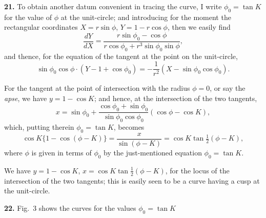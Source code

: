 \documentclass[12pt,a4paper]{article}
\theoremstyle{definition}
\begin{document}
\noindent\textbf{21.} To obtain another datum convenient in tracing the curve, I write $\phi_0 = \tan K$ for the value of $\phi$ at the unit-circle; and introducing for the moment the rectangular coordinates $X = r\sin\phi$, $Y = 1 - r\cos\phi$, then we easily find
\[
\frac{dY}{dX} = \frac{r\sin\phi_0 - \cos\phi}{r\cos\phi_0 + r^3\sin\phi_0\sin\phi},
\]
and thence, for the equation of the tangent at the point on the unit-circle,
\[
\sin\phi_0\cos\phi \cdot (Y - 1 + \cos\phi_0) = -\frac{1}{r^2}(X - \sin\phi_0\cos\phi_0).
\]

For the tangent at the point of intersection with the radius $\phi = 0$, or say the \textit{apse}, we have $y = 1 - \cos K$; and hence, at the intersection of the two tangents,
\[
x = \sin\phi_0 + \frac{\cos\phi_0 + \sin\phi_0}{\sin\phi_0\cos\phi_0}(\cos\phi - \cos K),
\]
which, putting therein $\phi_0 = \tan K$, becomes
\[
\cos K\{1 - \cos(\phi - K)\} = \frac{x}{\sin(\phi - K)} = \cos K\tan\tfrac{1}{2}(\phi - K),
\]
where $\phi$ is given in terms of $\phi_0$ by the just-mentioned equation $\phi_0 = \tan K$.

We have $y = 1 - \cos K$, $x = \cos K\tan\tfrac{1}{2}(\phi - K)$, for the locus of the intersection of the two tangents; this is easily seen to be a curve having a cusp at the unit-circle.

\noindent\textbf{22.} Fig.~3 shows the curves for the values $\phi_0 = \tan K$
\end{document}

